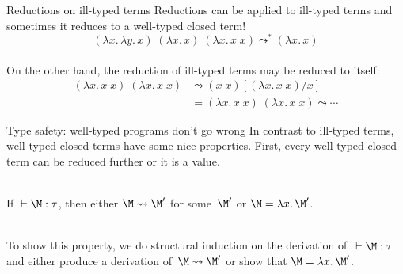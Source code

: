 \begin{frame}{Reductions on ill-typed terms}
  Reductions can be applied to ill-typed terms
  and sometimes it reduces to a well-typed closed term! 
  \[
        (\lambda x.\,\lambda y.\,x)\;(\lambda x.\,x)\;(\lambda x.\,x\;x)
        \leadsto^* (\lambda x.\, x)
  \]
  ~\\

  On the other hand, 
  the reduction of ill-typed terms may be reduced to itself:
  \begin{align*}
    (\lambda x.\, x\; x)\;(\lambda x.\, x\; x)
    & \leadsto (x\; x)[(\lambda x.\, x\; x)/ x] \\
    & = (\lambda x.\, x\; x)\;(\lambda x.\, x\; x) 
    \leadsto \cdots
  \end{align*}
\end{frame}

\begin{frame}{Type safety: well-typed programs don't go wrong}
  In contrast to ill-typed terms, well-typed closed terms have some nice
  properties.  First, every well-typed closed term can be reduced further or it
  is a
  \alert{value}.
  \\~\\
  \begin{theorem}
    If ${}\vdash \M:\tau$, then either $\M \leadsto \M'$ for some~$\M'$
    or $\M = \lambda x.\, \M'$. 
  \end{theorem}
  ~\\
  To show this property, we do structural induction on the derivation
  of~${}\vdash \M : \tau$ and either produce a derivation of~$\M \leadsto \M'$
  or show that $\M = \lambda x.\, \M'$.
\end{frame}

